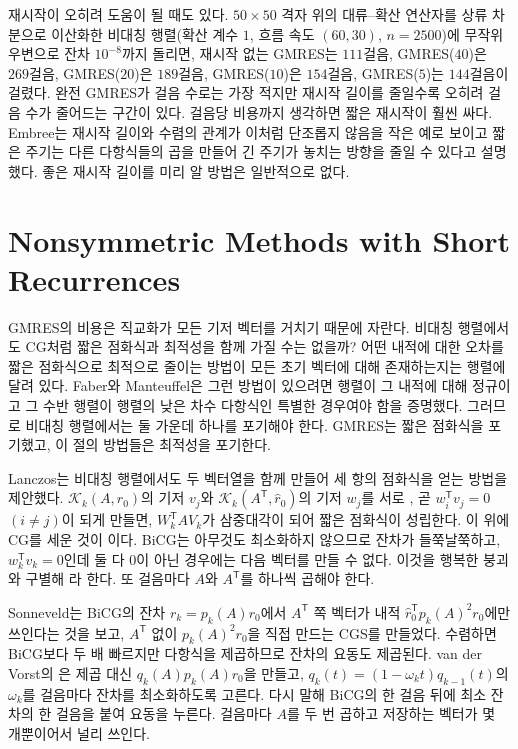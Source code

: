 재시작이 오히려 도움이 될 때도 있다. $50\times50$ 격자 위의 대류--확산 연산자를 상류 차분으로 이산화한 비대칭 행렬(확산 계수 $1$, 흐름 속도 $(60,30)$, $n=2500$)에 무작위 우변으로 잔차 $10^{-8}$까지 돌리면, 재시작 없는 GMRES는 $111$걸음, GMRES($40$)은 $269$걸음, GMRES($20$)은 $189$걸음, GMRES($10$)은 $154$걸음, GMRES($5$)는 $144$걸음이 걸렸다. 완전 GMRES가 걸음 수로는 가장 적지만 재시작 길이를 줄일수록 오히려 걸음 수가 줄어드는 구간이 있다. 걸음당 비용까지 생각하면 짧은 재시작이 훨씬 싸다. Embree는 재시작 길이와 수렴의 관계가 이처럼 단조롭지 않음을 작은 예로 보이고 짧은 주기는 다른 다항식들의 곱을 만들어 긴 주기가 놓치는 방향을 줄일 수 있다고 설명했다\cite{embree2003tortoise}. 좋은 재시작 길이를 미리 알 방법은 일반적으로 없다.

\section{Nonsymmetric Methods with Short Recurrences}
\label{sec:bicg}

GMRES의 비용은 직교화가 모든 기저 벡터를 거치기 때문에 자란다. 비대칭 행렬에서도 CG처럼 짧은 점화식과 최적성을 함께 가질 수는 없을까? 어떤 내적에 대한 오차를 짧은 점화식으로 최적으로 줄이는 방법이 모든 초기 벡터에 대해 존재하는지는 행렬에 달려 있다. Faber와 Manteuffel은 그런 방법이 있으려면 행렬이 그 내적에 대해 정규이고 그 수반 행렬이 행렬의 낮은 차수 다항식인 특별한 경우여야 함을 증명했다\cite{faber1984}. 그러므로 비대칭 행렬에서는 둘 가운데 하나를 포기해야 한다. GMRES는 짧은 점화식을 포기했고, 이 절의 방법들은 최적성을 포기한다.

Lanczos는 비대칭 행렬에서도 두 벡터열을 함께 만들어 세 항의 점화식을 얻는 방법을 제안했다. $\mathcal K_k(A,r_0)$의 기저 $v_j$와 $\mathcal K_k(A^{\mathsf T},\hat r_0)$의 기저 $w_j$를 서로 , 곧 $w_i^{\mathsf T}v_j=0$ $(i\ne j)$이 되게 만들면, $W_k^{\mathsf T}AV_k$가 삼중대각이 되어 짧은 점화식이 성립한다. 이 위에 CG를 세운 것이 이다\cite{fletcher1976}. BiCG는 아무것도 최소화하지 않으므로 잔차가 들쭉날쭉하고, $w_k^{\mathsf T}v_k=0$인데 둘 다 $0$이 아닌 경우에는 다음 벡터를 만들 수 없다. 이것을 행복한 붕괴와 구별해 라 한다. 또 걸음마다 $A$와 $A^{\mathsf T}$를 하나씩 곱해야 한다.

Sonneveld는 BiCG의 잔차 $r_k=p_k(A)r_0$에서 $A^{\mathsf T}$ 쪽 벡터가 내적 $\hat r_0^{\mathsf T}p_k(A)^2r_0$에만 쓰인다는 것을 보고, $A^{\mathsf T}$ 없이 $p_k(A)^2r_0$을 직접 만드는 CGS를 만들었다\cite{sonneveld1989}. 수렴하면 BiCG보다 두 배 빠르지만 다항식을 제곱하므로 잔차의 요동도 제곱된다. van der Vorst의 은 제곱 대신 $q_k(A)p_k(A)r_0$을 만들고, $q_k(t)=(1-\omega_kt)q_{k-1}(t)$의 $\omega_k$를 걸음마다 잔차를 최소화하도록 고른다\cite{vandervorst1992}. 다시 말해 BiCG의 한 걸음 뒤에 최소 잔차의 한 걸음을 붙여 요동을 누른다. 걸음마다 $A$를 두 번 곱하고 저장하는 벡터가 몇 개뿐이어서 널리 쓰인다.

